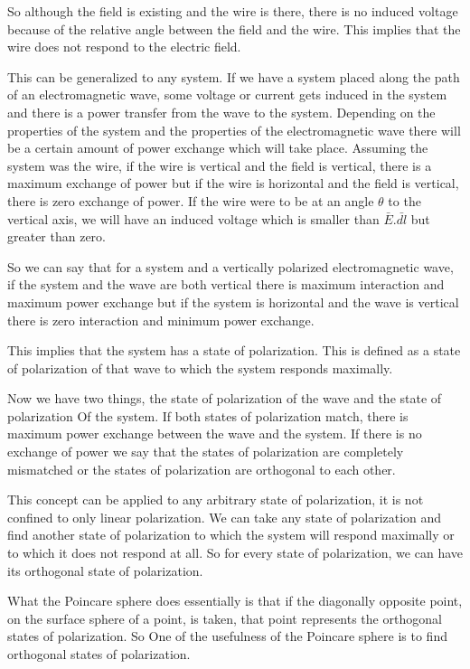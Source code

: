 So although the field is existing and the wire is there, there is no induced voltage because of the relative angle between the field and the wire. This implies that the wire does not respond to the electric field.

This can be generalized to any system. If we have a system placed along the path of an electromagnetic wave, some voltage or current gets induced in the system and there is a power transfer from the wave to the system. Depending on the properties of the system and the properties of the electromagnetic wave there will be a certain amount of power exchange which will take place. Assuming the system was the wire, if the wire is vertical and the field is vertical, there is a maximum exchange of power but if the wire is horizontal and the field is vertical, there is zero exchange of power. If the wire were to be at an angle $\theta$ to the vertical axis, we will have an induced voltage which is smaller than $\bar{E}$.$\bar{dl}$ but greater than zero.

So we can say that for a system and a vertically polarized electromagnetic wave, if the system and the wave are both vertical there is maximum interaction and maximum power exchange but if the system is horizontal and the wave is vertical there is zero interaction and minimum power exchange.

This implies that the system has a state of polarization. This is defined as a state of polarization of that wave to which the system responds maximally.

Now we have two things, the state of polarization of the wave and the state of polarization Of the system. If both states of polarization match, there is maximum power exchange between the wave and the system. If there is no exchange of power we say that the states of polarization are completely mismatched or the states of polarization are orthogonal to each other.

This concept can be applied to any arbitrary state of polarization, it is not confined to only linear polarization. We can take any state of polarization and find another state of polarization to which the system will respond maximally or to which it does not respond at all. So for every state of polarization, we can have its orthogonal state of polarization. 

What the Poincare sphere does essentially is that if the diagonally opposite point, on the surface sphere of a point, is taken, that point represents the orthogonal states of polarization. So One of the usefulness of the Poincare sphere is to find orthogonal states of polarization.

